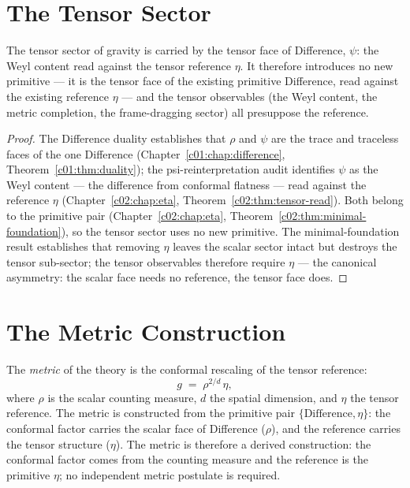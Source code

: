 \section{The Tensor Sector}
\label{c10:sec:tensor-sector}

\begin{theorem}
\label{c10:thm:tensor-face}
The tensor sector of gravity is carried by the tensor face of Difference, $\psi$: the
Weyl content read against the tensor reference $\eta$. It therefore introduces no new
primitive --- it is the tensor face of the existing primitive Difference, read against the
existing reference $\eta$ --- and the tensor observables (the Weyl content, the metric
completion, the frame-dragging sector) all presuppose the reference.
\end{theorem}

\begin{proof}
The Difference duality \cite{c10:QG286} establishes that $\rho$ and $\psi$ are the trace and
traceless faces of the one Difference (Chapter~\ref{c01:chap:difference},
Theorem~\ref{c01:thm:duality}); the psi-reinterpretation audit \cite{c10:QG285} identifies
$\psi$ as the Weyl content --- the difference from conformal flatness --- read against the
reference $\eta$ (Chapter~\ref{c02:chap:eta}, Theorem~\ref{c02:thm:tensor-read}). Both belong
to the primitive pair (Chapter~\ref{c02:chap:eta},
Theorem~\ref{c02:thm:minimal-foundation}), so the tensor sector uses no new primitive. The
minimal-foundation result \cite{c10:QG292} establishes that removing $\eta$ leaves the
scalar sector intact but destroys the tensor sub-sector; the tensor observables therefore
require $\eta$ --- the canonical asymmetry: the scalar face needs no reference, the tensor
face does.
\end{proof}

\section{The Metric Construction}
\label{c10:sec:metric-construction}

\begin{theorem}
\label{c10:thm:metric-construction}
The \emph{metric} of the theory is the conformal rescaling of the tensor reference:
\begin{equation}
\label{c10:eq:metric}
g \;=\; \rho^{2/d}\,\eta,
\end{equation}
where $\rho$ is the scalar counting measure, $d$ the spatial dimension, and $\eta$ the
tensor reference. The metric is constructed from the primitive pair
$\{\text{Difference},\eta\}$: the conformal factor carries the scalar face of Difference
($\rho$), and the reference carries the tensor structure ($\eta$). The metric is therefore
a derived construction: the conformal factor comes from the counting measure and the
reference is the primitive $\eta$; no independent metric postulate is required.
\end{theorem}

